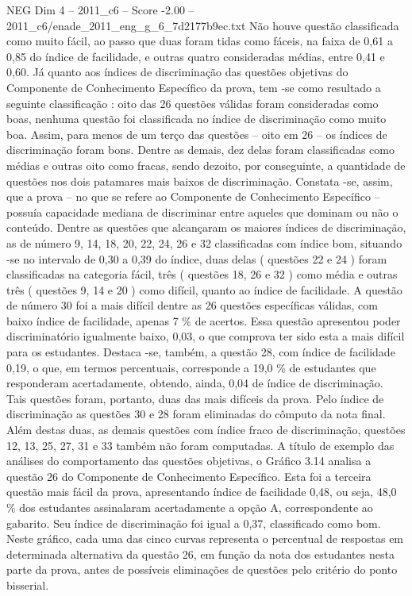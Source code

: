 \begin{textsample}{NEG Dim 4 – 2011\_c6 – Score -2.00 – 2011\_c6/enade\_2011\_eng\_g\_6\_7d2177b9ec.txt}
Não houve questão classificada como muito fácil, ao passo que duas foram tidas como fáceis, na faixa de 0,61 a 0,85 do índice de facilidade, e outras quatro consideradas médias, entre 0,41 e 0,60.
Já quanto aos índices de discriminação das questões objetivas do Componente de Conhecimento Específico da prova, tem -se como resultado a seguinte classificação : oito das 26 questões válidas foram consideradas como boas, nenhuma questão foi classificada no índice de discriminação como muito boa.
Assim, para menos de um terço das questões – oito em 26 – os índices de discriminação foram bons.
Dentre as demais, dez delas foram classificadas como médias e outras oito como fracas, sendo dezoito, por conseguinte, a quantidade de questões nos dois patamares mais baixos de discriminação.
Constata -se, assim, que a prova – no que se refere ao Componente de Conhecimento Específico – possuía capacidade mediana de discriminar entre aqueles que dominam ou não o conteúdo.
Dentre as questões que alcançaram os maiores índices de discriminação, as de número 9, 14, 18, 20, 22, 24, 26 e 32 classificadas com índice bom, situando -se no intervalo de 0,30 a 0,39 do índice, duas delas ( questões 22 e 24 ) foram classificadas na categoria fácil, três ( questões 18, 26 e 32 ) como média e outras três ( questões 9, 14 e 20 ) como difícil, quanto ao índice de facilidade.
A questão de número 30 foi a mais difícil dentre as 26 questões específicas válidas, com baixo índice de facilidade, apenas 7 \% de acertos.
Essa questão apresentou poder discriminatório igualmente baixo, 0,03, o que comprova ter sido esta a mais difícil para os estudantes.
Destaca -se, também, a questão 28, com índice de facilidade 0,19, o que, em termos percentuais, corresponde a 19,0 \% de estudantes que responderam acertadamente, obtendo, ainda, 0,04 de índice de discriminação.
Tais questões foram, portanto, duas das mais difíceis da prova.
Pelo índice de discriminação as questões 30 e 28 foram eliminadas do cômputo da nota final.
Além destas duas, as demais questões com índice fraco de discriminação, questões 12, 13, 25, 27, 31 e 33 também não foram computadas.
A título de exemplo das análises do comportamento das questões objetivas, o Gráfico 3.14 analisa a questão 26 do Componente de Conhecimento Específico.
Esta foi a terceira questão mais fácil da prova, apresentando índice de facilidade 0,48, ou seja, 48,0 \% dos estudantes assinalaram acertadamente a opção A, correspondente ao gabarito.
Seu índice de discriminação foi igual a 0,37, classificado como bom.
Neste gráfico, cada uma das cinco curvas representa o percentual de respostas em determinada alternativa da questão 26, em função da nota dos estudantes nesta parte da prova, antes de possíveis eliminações de questões pelo critério do ponto bisserial.

\end{textsample}
